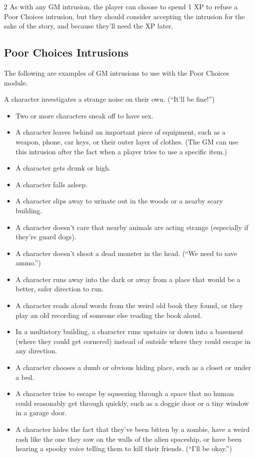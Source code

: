 \begin{multicols}{2}
As with any GM intrusion, the player can choose to spend 1 XP to refuse a Poor Choices intrusion, but they should consider accepting the intrusion for the sake of the story, and because they’ll need the XP later.

\subsection{Poor Choices Intrusions}

The following are examples of GM intrusions to use with the Poor Choices module.

A character investigates a strange noise on their own. (“It’ll be fine!”)

\begin{itemize}
\item Two or more characters sneak off to have sex.
\item A character leaves behind an important piece of equipment, such as a weapon, phone, car keys, or their outer layer of clothes. (The GM can use this intrusion after the fact when a player tries to use a specific item.)
\item A character gets drunk or high.
\item A character falls asleep.
\item A character slips away to urinate out in the woods or a nearby scary building.
\item A character doesn’t care that nearby animals are acting strange (especially if they’re guard dogs).
\item A character doesn’t shoot a dead monster in the head. (“We need to save ammo.”)
\item A character runs away into the dark or away from a place that would be a better, safer direction to run.
\item A character reads aloud words from the weird old book they found, or they play an old recording of someone else reading the book aloud.
\item In a multistory building, a character runs upstairs or down into a basement (where they could get cornered) instead of outside where they could escape in any direction.
\item A character chooses a dumb or obvious hiding place, such as a closet or under a bed.
\item A character tries to escape by squeezing through a space that no human could reasonably get through quickly, such as a doggie door or a tiny window in a garage door.
\item A character hides the fact that they’ve been bitten by a zombie, have a weird rash like the one they saw on the walls of the alien spaceship, or have been hearing a spooky voice telling them to kill their friends. (“I’ll be okay.”)

\end{itemize}
\end{multicols}
